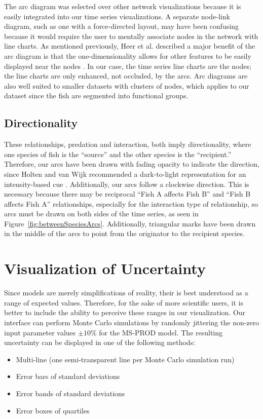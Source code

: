 The arc diagram was selected over other network visualizations because it is easily integrated into our time series visualizations.  A separate node-link diagram, such as one with a force-directed layout, may have been confusing because it would require the user to mentally associate nodes in the network with line charts.  As mentioned previously, Heer et al. described a major benefit of the arc diagram is that the one-dimensionality allows for other features to be easily displayed near the nodes \cite{heer2010}.  In our case, the time series line charts are the nodes; the line charts are only enhanced, not occluded, by the arcs.  Arc diagrams are also well suited to smaller datasets with clusters of nodes, which applies to our dataset since the fish are segmented into functional groups.

\subsection{Directionality}

These relationships, predation and interaction, both imply directionality, where one species of fish is the ``source'' and the other species is the ``recipient.''  Therefore, our arcs have been drawn with fading opacity to indicate the direction, since Holten and van Wijk recommended a dark-to-light representation for an intensity-based cue \cite{holten2009}.  Additionally, our arcs follow a clockwise direction.  This is necessary because there may be reciprocal ``Fish A affects Fish B'' and ``Fish B affects Fish A'' relationships, especially for the interaction type of relationship, so arcs must be drawn on both sides of the time series, as seen in Figure~\ref{fig:betweenSpeciesArcs}.  Additionally, triangular marks have been drawn in the middle of the arcs to point from the originator to the recipient species.

\section{Visualization of Uncertainty}

Since models are merely simplifications of reality, their is best understood as a range of expected values.  Therefore, for the sake of more scientific users, it is better to include the ability to perceive these ranges in our visualization.  Our interface can perform Monte Carlo simulations by randomly jittering the non-zero input parameter values $\pm 10\%$ for the MS-PROD model.  The resulting uncertainty can be displayed in one of the following methods:

 \begin{itemize}
   \item Multi-line (one semi-transparent line per Monte Carlo simulation run)
   \item Error bars of standard deviations
   \item Error bands of standard deviations
   \item Error boxes of quartiles
 \end{itemize}
